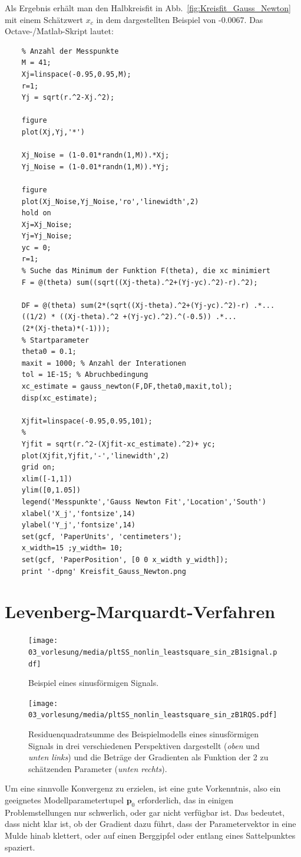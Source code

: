 Als Ergebnis erhält man den Halbkreisfit in Abb.~\ref*{fig:Kreisfit_Gauss_Newton} mit einem Schätzwert $x_c$ in dem dargestellten Beispiel von -0.0067.
Das Octave-/Matlab-Skript lautet: 
\begin{verbatim}
	% Anzahl der Messpunkte 
	M = 41;
	Xj=linspace(-0.95,0.95,M);
	r=1;
	Yj = sqrt(r.^2-Xj.^2);
	
	figure
	plot(Xj,Yj,'*')
	
	Xj_Noise = (1-0.01*randn(1,M)).*Xj;
	Yj_Noise = (1-0.01*randn(1,M)).*Yj;
	
	figure
	plot(Xj_Noise,Yj_Noise,'ro','linewidth',2)
	hold on
	Xj=Xj_Noise;
	Yj=Yj_Noise;
	yc = 0;
	r=1;
	% Suche das Minimum der Funktion F(theta), die xc minimiert
	F = @(theta) sum((sqrt((Xj-theta).^2+(Yj-yc).^2)-r).^2);
	
	DF = @(theta) sum(2*(sqrt((Xj-theta).^2+(Yj-yc).^2)-r) .*...
	((1/2) * ((Xj-theta).^2 +(Yj-yc).^2).^(-0.5)) .*...
	(2*(Xj-theta)*(-1)));
	% Startparameter
	theta0 = 0.1;
	maxit = 1000; % Anzahl der Interationen
	tol = 1E-15; % Abruchbedingung
	xc_estimate = gauss_newton(F,DF,theta0,maxit,tol);
	disp(xc_estimate);
	
	Xjfit=linspace(-0.95,0.95,101);
	% 
	Yjfit = sqrt(r.^2-(Xjfit-xc_estimate).^2)+ yc;
	plot(Xjfit,Yjfit,'-','linewidth',2)
	grid on;
	xlim([-1,1])
	ylim([0,1.05])
	legend('Messpunkte','Gauss Newton Fit','Location','South')
	xlabel('X_j','fontsize',14)
	ylabel('Y_j','fontsize',14)
	set(gcf, 'PaperUnits', 'centimeters');
	x_width=15 ;y_width= 10;
	set(gcf, 'PaperPosition', [0 0 x_width y_width]);
	print '-dpng' Kreisfit_Gauss_Newton.png
\end{verbatim}

\newpage
\section{Levenberg-Marquardt-Verfahren}
\begin{figure}[htp]
\begin{center}
\texttt{[image: 03\_vorlesung/media/pltSS\_nonlin\_leastsquare\_sin\_zB1signal.pdf]}
\end{center}
\caption{Beispiel eines sinusförmigen Signals.\label{LSoptiExampleSinus}}
\end{figure}
\begin{figure}
\begin{center}
\texttt{[image: 03\_vorlesung/media/pltSS\_nonlin\_leastsquare\_sin\_zB1RQS.pdf]}
\end{center}
\caption{Residuenquadratsumme des Beispielmodells eines sinusförmigen Signals
in drei verschiedenen Perspektiven dargestellt (\textsl{oben} und \textsl{unten links})
 und die Beträge der
Gradienten als Funktion der 2 zu schätzenden Parameter (\textsl{unten rechts}).\label{LSoptiExample1SinusRQS}}
\end{figure}
Um eine sinnvolle Konvergenz zu erzielen, ist eine gute Vorkenntnis, also ein geeignetes 
Modellparametertupel $\mathbf{p}_0$ erforderlich, das in einigen Problemstellungen
nur schwerlich, oder gar nicht verfügbar ist. Das bedeutet, dass nicht klar ist, ob
der Gradient dazu führt, dass der Parametervektor in eine Mulde hinab klettert, oder auf
einen Berggipfel oder entlang eines Sattelpunktes spaziert.

